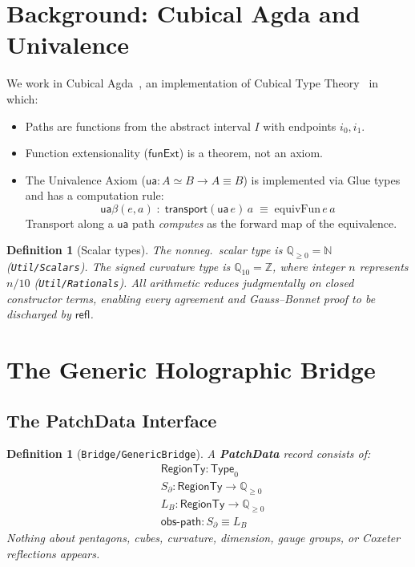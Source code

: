 \documentclass[11pt,a4paper]{article}
\newtheorem{definition}[theorem]{Definition}
\newcommand{\N}{\mathbb{N}}
\newcommand{\Z}{\mathbb{Z}}
\newcommand{\Qge}{\mathbb{Q}_{\geq 0}}
\newcommand{\Qten}{\mathbb{Q}_{10}}
\newcommand{\refl}{\mathsf{refl}}
\newcommand{\ua}{\mathsf{ua}}
\newcommand{\transport}{\mathsf{transport}}
\newcommand{\funExt}{\mathsf{funExt}}
\newcommand{\Type}{\mathsf{Type}}
\newcommand{\module}[1]{\texttt{#1}}
\begin{document}
\section{Background: Cubical Agda and Univalence}
\label{sec:background}

We work in Cubical Agda~\cite{VezzosiMortbergAbel2021}, an
implementation of Cubical Type Theory~\cite{CCHM2018} in which:
\begin{itemize}[nosep]
\item Paths are functions from the abstract interval $I$ with
  endpoints $i_0, i_1$.
\item Function extensionality ($\funExt$) is a theorem, not an axiom.
\item The Univalence Axiom ($\ua : A \simeq B \to A \equiv B$) is
  implemented via Glue types and has a computation rule:
  \[
    \ua\beta(e, a) \;:\;
    \transport(\ua\, e)\, a \;\equiv\; \mathrm{equivFun}\, e\, a
  \]
  Transport along a $\ua$ path \emph{computes} as the forward map
  of the equivalence.
\end{itemize}

\begin{definition}[Scalar types]
\label{def:scalars}
The nonneg.\ scalar type is $\Qge = \N$ (\module{Util/Scalars}).
The signed curvature type is $\Qten = \Z$, where integer $n$
represents $n/10$ (\module{Util/Rationals}).  All arithmetic
reduces judgmentally on closed constructor terms, enabling every
agreement and Gauss--Bonnet proof to be discharged by $\refl$.
\end{definition}

\section{The Generic Holographic Bridge}
\label{sec:bridge}

\subsection{The PatchData Interface}

\begin{definition}[\module{Bridge/GenericBridge}]
\label{def:patchdata}
A \textbf{PatchData} record consists of:
\begin{align*}
  &\mathsf{RegionTy} : \Type_0 \\
  &S_\partial : \mathsf{RegionTy} \to \Qge \\
  &L_B : \mathsf{RegionTy} \to \Qge \\
  &\mathsf{obs\text{-}path} : S_\partial \equiv L_B
\end{align*}
Nothing about pentagons, cubes, curvature, dimension, gauge
groups, or Coxeter reflections appears.
\end{definition}
\end{document}
